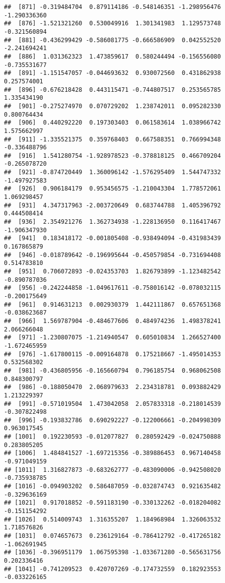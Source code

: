 \documentclass[
]{article}
\begin{document}
\begin{verbatim}
##  [871] -0.319484704  0.879114186 -0.548146351 -1.298956476 -1.290336360
##  [876] -1.521321260  0.530049916  1.301341983  1.129573748 -0.321560894
##  [881] -0.436299429 -0.586081775 -0.666586909  0.042552520 -2.241694241
##  [886]  1.031362323  1.473859617  0.580244494 -0.156556080 -0.735531677
##  [891] -1.151547057 -0.044693632  0.930072560  0.431862938  0.257574001
##  [896] -0.676218428  0.443115471 -0.744807517  0.253565785  1.335434190
##  [901] -0.275274970  0.070729202  1.238742011  0.095282330  0.800764434
##  [906]  0.440292220  0.197303403  0.061583614  1.038966742  1.575662997
##  [911] -1.335521375  0.359768403  0.667588351  0.766994348 -0.336488796
##  [916]  1.541280754 -1.928978523 -0.378818125  0.466709204 -0.265078720
##  [921] -0.874720449  1.360096142 -1.576295409  1.544747332 -1.497927583
##  [926]  0.906184179  0.953456575 -1.210043304  1.778572061  1.069298457
##  [931]  4.347317963 -2.003720649  0.683744788  1.405396792  0.444508414
##  [936]  2.354921276  1.362734938 -1.228136950  0.116417467 -1.906347930
##  [941]  0.183418172 -0.001805408 -0.938494094 -0.431983439  0.167865879
##  [946] -0.018789642 -0.196995644 -0.450579854 -0.731694408  0.514783810
##  [951]  0.706072893 -0.024353703  1.826793899 -1.123482542 -0.890787036
##  [956] -0.242244858 -1.049617611 -0.758016142 -0.078032115 -0.200175649
##  [961]  0.914631213  0.002930379  1.442111867  0.657651368 -0.038623687
##  [966]  1.569787904 -0.484677606  0.484974236  1.498378241  2.066266048
##  [971] -1.230807075 -1.214940547  0.605010834  1.266527400 -1.672465959
##  [976] -1.617800115 -0.009164878  0.175218667 -1.495014353  0.532568302
##  [981] -0.436805956 -0.165660794  0.796185754  0.968062508  0.848300797
##  [986] -0.188050470  2.068979633  2.234318781  0.093882429  1.213229397
##  [991] -0.571019504  1.473042058  2.057833318 -0.218014539 -0.307822498
##  [996] -0.193832786  0.690292227 -0.122006661 -0.204998309  0.963017545
## [1001]  0.192230593 -0.012077827  0.280592429 -0.024750888  0.283805205
## [1006]  1.484841527 -1.697215356 -0.389886453  0.967140458 -0.971049159
## [1011]  1.316827873 -0.683262777 -0.483090006 -0.942508020 -0.735938785
## [1016] -0.094903202  0.586487059 -0.032874743  0.921635482 -0.329636169
## [1021]  0.917018852 -0.591183190 -0.330132262 -0.018204082 -0.151154292
## [1026]  0.514009743  1.316355207  1.184968984  1.326063532  1.718576826
## [1031]  0.074657673  0.236129164 -0.786412792 -0.417265182 -1.062691945
## [1036] -0.396951179  1.067595398 -1.033671280 -0.565631756  0.202336416
## [1041] -0.741209523  0.420707269 -0.174732559  0.182923553 -0.033226165

\end{verbatim}
\end{document}
